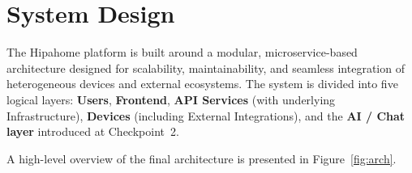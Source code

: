 \documentclass[a4paper,12pt]{article}
\begin{document}
\section{System Design}
\label{sec:design}

The Hipahome platform is built around a modular, microservice-based architecture designed for scalability, maintainability, and seamless integration of heterogeneous devices and external ecosystems. The system is divided into five logical layers: \textbf{Users}, \textbf{Frontend}, \textbf{API Services} (with underlying Infrastructure), \textbf{Devices} (including External Integrations), and the \textbf{AI / Chat layer} introduced at Checkpoint~2.

A high-level overview of the final architecture is presented in Figure~\ref{fig:arch}.
\end{document}
